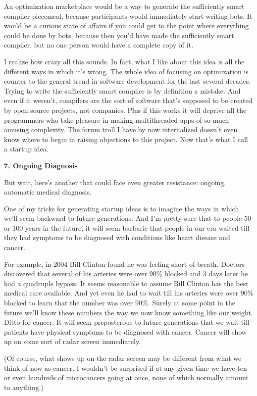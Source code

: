 An optimization marketplace would be a way to generate the sufficiently
smart compiler piecemeal, because participants would immediately start
writing bots. It would be a curious state of affairs if you could get to
the point where everything could be done by bots, because then you'd
have made the sufficiently smart compiler, but no one person would have
a complete copy of it.

I realize how crazy all this sounds. In fact, what I like about this
idea is all the different ways in which it's wrong. The whole idea of
focusing on optimization is counter to the general trend in software
development for the last several decades. Trying to write the
sufficiently smart compiler is by definition a mistake. And even if it
weren't, compilers are the sort of software that's supposed to be
created by open source projects, not companies. Plus if this works it
will deprive all the programmers who take pleasure in making
multithreaded apps of so much amusing complexity. The forum troll I have
by now internalized doesn't even know where to begin in raising
objections to this project. Now that's what I call a startup idea.

\textbf{7. Ongoing Diagnosis}

But wait, here's another that could face even greater resistance:
ongoing, automatic medical diagnosis.

One of my tricks for generating startup ideas is to imagine the ways in
which we'll seem backward to future generations. And I'm pretty sure
that to people 50 or 100 years in the future, it will seem barbaric that
people in our era waited till they had symptoms to be diagnosed with
conditions like heart disease and cancer.

For example, in 2004 Bill Clinton found he was feeling short of breath.
Doctors discovered that several of his arteries were over 90\% blocked
and 3 days later he had a quadruple bypass. It seems reasonable to
assume Bill Clinton has the best medical care available. And yet even he
had to wait till his arteries were over 90\% blocked to learn that the
number was over 90\%. Surely at some point in the future we'll know
these numbers the way we now know something like our weight. Ditto for
cancer. It will seem preposterous to future generations that we wait
till patients have physical symptoms to be diagnosed with cancer. Cancer
will show up on some sort of radar screen immediately.

(Of course, what shows up on the radar screen may be different from what
we think of now as cancer. I wouldn't be surprised if at any given time
we have ten or even hundreds of microcancers going at once, none of
which normally amount to anything.)

